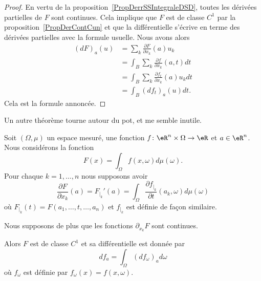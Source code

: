 \begin{proof}
    En vertu de la proposition~\ref{PropDerrSSIntegraleDSD}, toutes les dérivées partielles de \( F\) sont continues. Cela implique que \( F\) est de classe \( C^1\) par la proposition~\ref{PropDerContCun} et que la différentielle s'écrive en terme des dérivées partielles avec la formule usuelle. Nous avons alors
    \begin{subequations}
        \begin{align}
            (dF)_a(u)&=\sum_k\frac{ \partial F }{ \partial x_k }(a)u_k\\
            &=\int_B\sum_k\frac{ \partial f }{ \partial x_k }(a,t)dt\\
            &=\int_B\sum_k\frac{ \partial f_t }{ \partial x_k }(a)u_kdt\\
            &=\int_B (df_t)_a(u)dt.
        \end{align}
    \end{subequations}
    Cela est la formule annoncée.
\end{proof}

Un autre théorème tourne autour du pot, et me semble inutile.
\begin{theorem} \label{ThoOLAQyRL}
    Soit \( (\Omega,\mu)\) un espace mesuré, une fonction \( f\colon \eR^n\times \Omega\to \eR\) et \( a\in \eR^n\). Nous considérons la fonction
    \begin{equation}
        F(x)=\int_{\Omega}f(x,\omega)d\mu(\omega).
    \end{equation}
    Pour chaque \( k=1,\ldots, n\) nous supposons avoir
    \begin{equation}
        \frac{ \partial F }{ \partial x_k }(a)=F_{|_k}'(a)=\int_{\Omega}\frac{ \partial f_{|_k} }{ \partial t }(a_k,\omega)d\mu(\omega)
    \end{equation}
    où \( F_{|_k}(t)=F(a_1,\ldots, t,\ldots, a_n)\) et \( f_{|_k}\) est définie de façon similaire.

    Nous supposons de plus que les fonctions \( \partial_{x_k}F\) sont continues.

    Alors \( F\) est de classe \( C^1\) et sa différentielle est donnée par
    \begin{equation}
        df_a=\int_{\Omega}(df_{\omega})_ad\omega
    \end{equation}
    où \( f_{\omega}\) est définie par \( f_{\omega}(x)=f(x,\omega)\).
\end{theorem}

